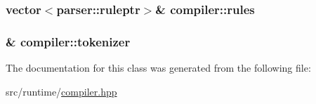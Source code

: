 \subsubsection[{\texorpdfstring{rules}{rules}}]{\setlength{\rightskip}{0pt plus 5cm}vector$<${\bf parser\+::ruleptr}$>$\& compiler\+::rules}\hypertarget{classcompiler_a1b712963929882f359df919ce73bbf4e}{}\label{classcompiler_a1b712963929882f359df919ce73bbf4e}
\subsubsection[{\texorpdfstring{tokenizer}{tokenizer}}]{\& compiler\+::tokenizer}\hypertarget{classcompiler_a888ac16dbb82fa8a9500633addcd22ba}{}\label{classcompiler_a888ac16dbb82fa8a9500633addcd22ba}


The documentation for this class was generated from the following file\+:\begin{DoxyCompactItemize}
\item 
src/runtime/\hyperlink{compiler_8hpp}{compiler.\+hpp}\end{DoxyCompactItemize}
